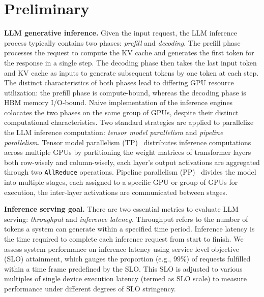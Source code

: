 \vspace{-0.75em}
\section{Preliminary}
\vspace{-0.5em}


\textbf{LLM generative inference.} Given the input request, the LLM inference process typically contains two phases: \textit{prefill} and \textit{decoding}. The prefill phase processes the request to compute the KV cache and generates the first token for the response in a single step. The decoding phase then takes the last input token and KV cache as inputs to generate subsequent tokens by one token at each step. The distinct characteristics of both phases lead to differing GPU resource utilization: the prefill phase is compute-bound, whereas the decoding phase is HBM memory I/O-bound. Naive implementation of the inference engines colocates the two phases on the same group of GPUs, despite their distinct computational characteristics. Two standard strategies are applied to parallelize the LLM inference computation: \textit{tensor model parallelism} and \textit{pipeline parallelism}. Tensor model parallelism (TP)~\citep{narayanan2021efficient} distributes inference computations across multiple GPUs by partitioning the weight matrices of transformer layers both row-wisely and column-wisely, each layer's output activations are aggregated through two \texttt{AllReduce} operations. Pipeline parallelism (PP)~\citep{huang2019gpipe} divides the model into multiple stages, each assigned to a specific GPU or group of GPUs for execution, the inter-layer activations are communicated between stages.

\textbf{Inference serving goal.}
\label{sec:slo}
There are two essential metrics to evaluate LLM serving: \textit{throughput} and \textit{inference latency}. Throughput refers to the number of tokens a system can generate within a specified time period. Inference latency is the time required to complete each inference request from start to finish. We assess system performance on inference latency using service level objective (SLO) attainment, which gauges the proportion (e.g., $99\%$) of requests fulfilled within a time frame predefined by the SLO. This SLO is adjusted to various multiples of single device execution latency (termed as SLO scale) to measure performance under different degrees of SLO stringency.

